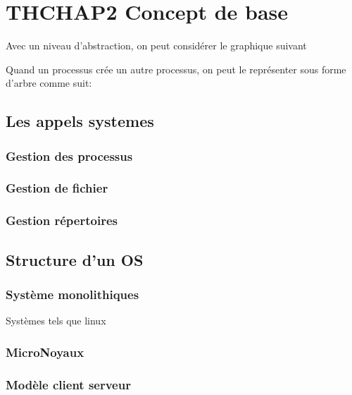 \section{THCHAP2 Concept de base}%
    Avec un niveau d'abstraction, on peut considérer le graphique suivant 

    Quand un processus crée un autre processus, on peut le représenter sous forme d'arbre comme suit: 


    \subsection{Les appels systemes}


    \subsubsection{Gestion des processus}

    \subsubsection{Gestion de fichier}

    \subsubsection{Gestion répertoires}

\subsection{Structure d'un OS}
    \subsubsection{Système monolithiques}
        Systèmes tels que linux
    \subsubsection{MicroNoyaux}
    \subsubsection{Modèle client serveur}
